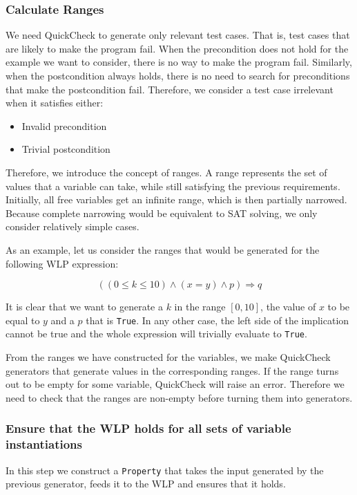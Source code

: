 \documentclass[a4paper]{article}
\begin{document}
\subsubsection*{Calculate Ranges}

We need QuickCheck to generate only relevant test cases. That is, test cases that
are likely to make the program fail. When the precondition does not hold
for the example we want to consider, there is no way to make the program fail.
Similarly, when the postcondition always holds, there is no need to search for
preconditions that make the postcondition fail. Therefore, we consider a test
case irrelevant when it satisfies either:

\begin{itemize}
\item Invalid precondition
\item Trivial postcondition
\end{itemize}

Therefore, we introduce the concept of ranges. A range represents the set of
values that a variable can take, while still satisfying the previous requirements.
Initially, all free variables get an infinite range, which is then partially narrowed.
Because complete narrowing would be equivalent to SAT solving, we only consider
relatively simple cases.

As an example, let us consider the ranges that would be generated for the following WLP
expression:

\[ ((0 \leq k \leq 10) \wedge (x = y) \wedge p) \Rightarrow q \]

It is clear that we want to generate a $k$ in the range $[0, 10]$, the value of
$x$ to be equal to $y$ and a $p$ that is \texttt{True}. In any other case, the
left side of the implication cannot be true and the whole expression will
trivially evaluate to \texttt{True}.

From the ranges we have constructed for the variables, we make QuickCheck
generators that generate values in the corresponding ranges. If the range turns
out to be empty for some variable, QuickCheck will raise an error. Therefore
we need to check that the ranges are non-empty before turning them into generators.

\subsubsection*{Ensure that the WLP holds for all sets of variable instantiations}

In this step we construct a \texttt{Property} that takes the input generated by
the previous generator, feeds it to the WLP and ensures that it holds.
\end{document}
